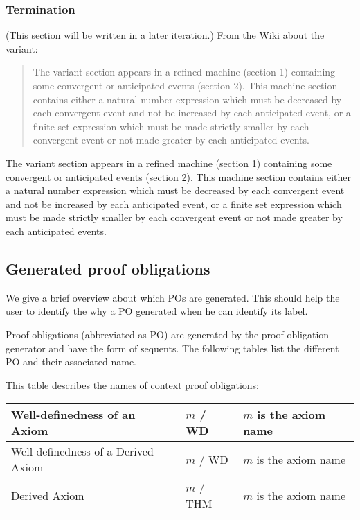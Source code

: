 \subsubsection{Termination}
\label{termination}
(This section will be written in a later iteration.)
From the Wiki about the variant:
\begin{quote}
  The variant section appears in a refined machine (section 1) containing some convergent or anticipated events (section 2).
  This machine section contains either a natural number expression which must be decreased by each convergent event and not be
  increased by each anticipated event, or a finite set expression which must be made strictly smaller by each convergent event 
  or not made greater by each anticipated events. 
\end{quote}

The variant section appears in a refined machine (section 1) containing some convergent or anticipated events (section 2). This machine section contains either a natural number expression which must be decreased by each convergent event and not be increased by each anticipated event, or a finite set expression which must be made strictly smaller by each convergent event or not made greater by each anticipated events. 

\subsection{Generated proof obligations}
\label{ref:generated_proof_obligations}

We give a brief overview about which POs are generated. This should help the user to identify the why a PO generated when he can identify its label.

Proof obligations (abbreviated as PO) are generated by the proof obligation generator and have the form of sequents. The following tables list the different PO and their associated name.

This table describes the names of context proof obligations: 

\begin{center}
    \begin{tabular}{| p{6cm} | p{3cm} | p{5cm} |}
    \hline
	Well-definedness of an Axiom & $m$ / WD & $m$ is the axiom name\\ \hline
	Well-definedness of a Derived Axiom & $m$  / WD & $m$ is the axiom name \\ \hline
	Derived Axiom & $m$  / THM & $m$ is the axiom name \\ \hline
    \end{tabular}
\end{center}

